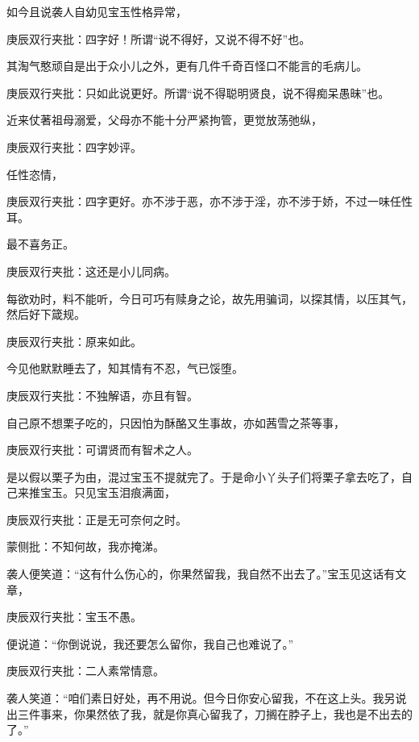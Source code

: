 \begin{parag}


    如今且说袭人自幼见宝玉性格异常，\begin{note}庚辰双行夹批：四字好！所谓“说不得好，又说不得不好”也。\end{note}其淘气憨顽自是出于众小儿之外，更有几件千奇百怪口不能言的毛病儿。\begin{note}庚辰双行夹批：只如此说更好。所谓“说不得聪明贤良，说不得痴呆愚昧”也。\end{note}近来仗著祖母溺爱，父母亦不能十分严紧拘管，更觉放荡弛纵，\begin{note}庚辰双行夹批：四字妙评。\end{note}任性恣情，\begin{note}庚辰双行夹批：四字更好。亦不涉于恶，亦不涉于淫，亦不涉于娇，不过一味任性耳。\end{note}最不喜务正。\begin{note}庚辰双行夹批：这还是小儿同病。\end{note}每欲劝时，料不能听，今日可巧有赎身之论，故先用骗词，以探其情，以压其气，然后好下箴规。\begin{note}庚辰双行夹批：原来如此。\end{note}今见他默默睡去了，知其情有不忍，气已馁堕。\begin{note}庚辰双行夹批：不独解语，亦且有智。\end{note}自己原不想栗子吃的，只因怕为酥酪又生事故，亦如茜雪之茶等事，\begin{note}庚辰双行夹批：可谓贤而有智术之人。\end{note}是以假以栗子为由，混过宝玉不提就完了。于是命小丫头子们将栗子拿去吃了，自己来推宝玉。只见宝玉泪痕满面，\begin{note}庚辰双行夹批：正是无可奈何之时。\end{note}\begin{note}蒙侧批：不知何故，我亦掩涕。\end{note}袭人便笑道：“这有什么伤心的，你果然留我，我自然不出去了。”宝玉见这话有文章，\begin{note}庚辰双行夹批：宝玉不愚。\end{note}便说道：“你倒说说，我还要怎么留你，我自己也难说了。”\begin{note}庚辰双行夹批：二人素常情意。\end{note}袭人笑道：“咱们素日好处，再不用说。但今日你安心留我，不在这上头。我另说出三件事来，你果然依了我，就是你真心留我了，刀搁在脖子上，我也是不出去的了。”
\end{parag}


